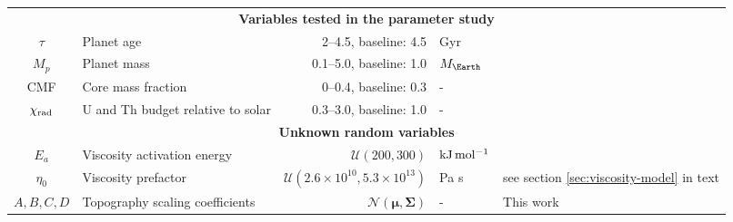 \documentclass[trackchanges]{aastex63}
\newcommand{\todo}[1]{\textit{\textcolor{violet}{{#1}}}}
\begin{document}
\begin{table*}
\begin{tabular}{@{} c l r l p{6cm} @{}}

\midrule
\multicolumn{5}{c}{\textbf{Variables tested in the parameter study}} \\
$\tau$ & Planet age & 2--4.5, \enspace baseline: 4.5 & Gyr \\
$M_p$ & Planet mass & 0.1--5.0, \enspace baseline: 1.0 & $M_\Earth$ & \citet{rogers_most_2015, zeng_mass-radius_2016} \\
CMF & Core mass fraction & 0--0.4, \enspace baseline: 0.3 & - & \citet{zeng_mass-radius_2016} \\
$\chi_{\rm rad}$ & U and Th budget relative to solar & 0.3--3.0, \enspace baseline: 1.0 & - & \citet{nimmo_radiogenic_2020} \\

\midrule
\multicolumn{5}{c}{\textbf{Unknown random variables}} \\
$E_a$ & Viscosity activation energy & $\mathcal{U}(200, 300)$ & $\rm{kJ\,mol^{-1}}$ & \citet{karato_rheology_1993, zhang_diffusion_2017} \\
$\eta_0$ & Viscosity prefactor & $\mathcal{U}(2.6 \times 10^{10} , 5.3\times 10^{13})$ & Pa s & see section \ref{sec:viscosity-model} in text \\
$A, B, C, D$ & Topography scaling coefficients & $\mathcal{N}(\mathbf{\mu}, \mathbf{\Sigma})$\tablenotemark{a} & - & This work \\

\bottomrule
\end{tabular}
\end{table*}

\end{document}
